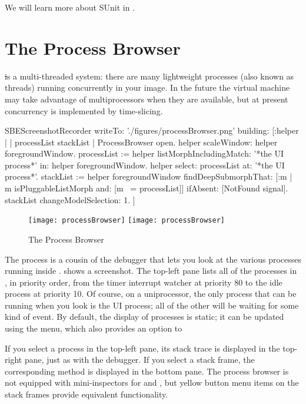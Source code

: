 \documentclass[a4paper,10pt,twoside]{book}
\begin{document}
We will learn more about SUnit in .


\section{The Process Browser}

\st is a multi-threaded system: there are many lightweight processes (also known as threads) running concurrently in your image. 
In the future the \sq virtual machine may take advantage of multiprocessors when they are available, but at present concurrency is implemented by time-slicing.

\begin{ExecuteSmalltalkScript}
SBEScreenshotRecorder writeTo: './figures/processBrowser.png' building: [:helper |
	| processList stackList |
	ProcessBrowser open.
	helper scaleWindow: helper foregroundWindow.
	processList := helper listMorphIncludingMatch: '*the UI process*' in: helper foregroundWindow.
	helper select: processList at: '*the UI process*'.
	stackList := helper foregroundWindow findDeepSubmorphThat: [:m | m isPluggableListMorph and: [m ~= processList]] ifAbsent: [NotFound signal].
	stackList changeModelSelection: 1.
]
\end{ExecuteSmalltalkScript}
\begin{figure}[btp]
	\begin{center}
	\ifluluelse
		{\texttt{[image: processBrowser]}}
		{\texttt{[image: processBrowser]}}
	\end{center}
	\caption{The Process Browser}
	\label{fig:processBrowser}
\end{figure}

The process  is a cousin of the debugger that lets you look at the various processes running inside \sq.
 shows a screenshot.
The top-left pane lists all of the processes in \sq, in priority order, from the timer interrupt watcher at priority 80 to the idle process at priority 10.
Of course, on a uniprocessor, the only process that can be running when you look is the UI process; all of the other will be waiting for some kind of event. 
By default, the display of processes is static; it can be updated using the  menu, which also provides an option to 

If you select a process in the top-left pane, its stack trace is displayed in the top-right pane, just as with the debugger.
If you select a stack frame, the corresponding method is displayed in the bottom pane.
The process browser is not equipped with mini-inspectors for \self and , but yellow button menu items on the stack frames provide equivalent functionality.
\end{document}
